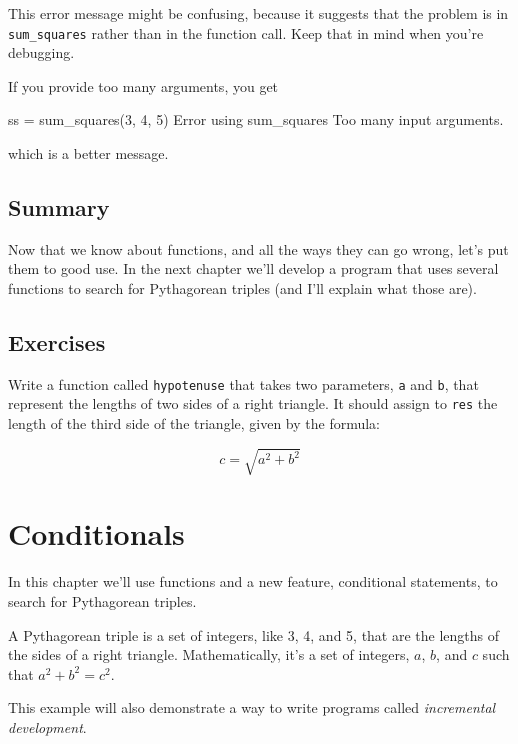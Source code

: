 This error message might be confusing, because it suggests that
the problem is in \verb"sum_squares" rather than in the function call.
Keep that in mind when you're debugging.

If you provide too many arguments, you get

\begin{code}
ss = sum_squares(3, 4, 5)
Error using sum_squares
Too many input arguments.
\end{code}

which is a better message.

\section{Summary}

Now that we know about functions, and all the ways they can go wrong, let's put them to good use.  In the next chapter we'll develop a program that uses several functions to search for Pythagorean triples (and I'll explain what those are).


\section{Exercises}

\begin{ex}
Write a function called {\tt hypotenuse} that takes two parameters, {\tt a} and {\tt b}, that represent the lengths of two sides of a right triangle.  It should assign to {\tt res} the length of the third side of the triangle, given by the formula:

\[ c = \sqrt{a^2 + b^2} \]
\end{ex}



\chapter{Conditionals}

In this chapter we'll use functions and a new feature, conditional statements, to search for Pythagorean triples.

A Pythagorean triple is a set of integers, like 3, 4, and 5,
that are the lengths of the sides of a right triangle.  Mathematically, it's a set of integers, $a$, $b$, and $c$ such that $a^2 + b^2 = c^2$.

This example will also demonstrate a way to write programs called {\em incremental development}.


